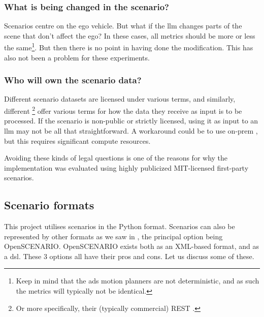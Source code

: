 \subsubsection{What is being changed in the scenario?}\label{sec:whatIsBeingChanged}

Scenarios centre on the ego vehicle. But what if the \acrshort{llm} changes parts of the scene that
don't affect the ego? In these cases, all metrics should be more or less the same\footnote{Keep in
    mind that the \acrshort{ads} motion planners are not deterministic, and as such the metrics will typically
    not be identical.}. But then there is no point in having done the modification. This has also not
been a problem for these experiments.

\subsubsection{Who will own the scenario data?}

Different scenario datasets are licensed under various terms, and similarly, different
\footnote{Or more specifically, their (typically commercial) REST .}
offer various terms for how the data they receive as input is to be processed. If the scenario is
non-public or strictly licensed, using it as input to an \acrshort{llm} may not be all that
straightforward. A workaround could be to use on-prem , but this requires
significant compute resources.

Avoiding these kinds of legal questions is one of the reasons for why the \hefe{} implementation was
evaluated using highly publicized MIT-licensed first-party scenarios.

\subsection{Scenario formats}

This project utilises scenarios in the Python format. Scenarios can also be represented by other
formats as we saw in , the principal option being OpenSCENARIO.
OpenSCENARIO exists both as an XML-based format, and as a \acrfull{dsl}. These \num{3} options all
have their pros and cons. Let us discuss some of these.

